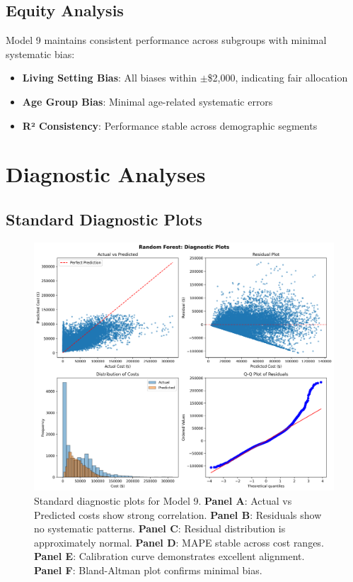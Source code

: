 \subsection{Equity Analysis}

Model 9 maintains consistent performance across subgroups with minimal systematic bias:

\begin{itemize}
    \item \textbf{Living Setting Bias}: All biases within $\pm$\$2,000, indicating fair allocation
    \item \textbf{Age Group Bias}: Minimal age-related systematic errors
    \item \textbf{R² Consistency}: Performance stable across demographic segments
\end{itemize}

\section{Diagnostic Analyses}

\subsection{Standard Diagnostic Plots}

\begin{figure}[h]
\centering
\includegraphics[width=\textwidth]{models/model_9/diagnostic_plots.png}
\caption{Standard diagnostic plots for Model 9. \textbf{Panel A}: Actual vs Predicted costs show strong correlation. \textbf{Panel B}: Residuals show no systematic patterns. \textbf{Panel C}: Residual distribution is approximately normal. \textbf{Panel D}: MAPE stable across cost ranges. \textbf{Panel E}: Calibration curve demonstrates excellent alignment. \textbf{Panel F}: Bland-Altman plot confirms minimal bias.}
\label{fig:model9_standard_diagnostics}
\end{figure}

